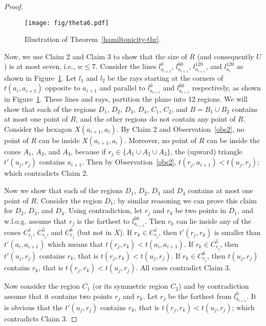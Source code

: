\documentclass[11pt,a4paper]{article}
\begin{document}
\begin{proof}
\begin{figure}[htb]
  \centering
  \texttt{[image: fig/theta6.pdf]}
 \caption{Illustration of Theorem~\ref{hamiltonicity-thr}.}
  \label{hamiltonicity-fig1}
\end{figure}

Now, we use Claim 2 and Claim 3 to show that the size of $R$ (and consequently $U$) is at most seven, i.e., $w\le 7$.
Consider the lines $l_{a_{i+1}}^0$, $l_{a_{i+1}}^{60}$, $l_{a_{i+1}}^{120}$, and $l_{a_{i}}^{120}$ as shown in Figure~\ref{hamiltonicity-fig1}. Let $l_1$ and $l_2$ be the rays starting at the corners of $t(a_i, a_{i+1})$ opposite to $a_{i+1}$ and parallel to $l_{a_{i+1}}^0$ and $l_{a_{i+1}}^{60}$ respectively, as shown in Figure~\ref{hamiltonicity-fig1}. These lines and rays, partition the plane into 12 regions. We will show that each of the regions $D_1$, $D_2$, $D_3$, $D_4$, $C_1$, $C_2$, and $B=B_1\cup B_2$ contains at most one point of $R$, and the other regions do not contain any point of $R$. Consider the hexagon $X(a_{i+1},a_i)$. By Claim 2 and Observation~\ref{obs2}, no point of $R$ can be inside $X(a_{i+1},a_i)$. Moreover, no point of $R$ can be inside the cones $A_1$, $A_2$, and $A_3$, because if $r_j\in \{A_1 \cup A_2\cup A_3\}$, the (upward) triangle $t'(u_j, r_j)$ contains $a_{i+1}$. Then by Observation~\ref{obs2}, $t(r_j, a_{i+1}) < t(u_j, r_j)$; which contradicts Claim 2.

Now we show that each of the regions $D_1$, $D_2$, $D_3$ and $D_4$ contains at most one point of $R$. Consider the region $D_1$; by similar reasoning we can prove this claim for $D_2$, $D_3$, and $D_4$. Using contradiction, let $r_j$ and $r_k$ be two points in $D_1$, and w.l.o.g. assume that $r_j$ is the farthest to $l_{a_{i+1}}^{60}$. Then $r_k$ can lie inside any of the cones $C_{r_j}^1$, $C_{r_j}^5$, and $C_{r_j}^6$ (but not in $X$). If $r_k \in C_{r_j}^1$, then $t'(r_j, r_k)$ is smaller than $t'(a_i, a_{i+1})$ which means that $t(r_j, r_k)< t(a_i,a_{i+1})$. If $r_k \in C_{r_j}^5$, then $t'(u_j,r_j)$ contains $r_k$, that is $t(r_j, r_k)< t(u_j, r_j)$. If $r_k \in C_{r_j}^6$, then $t(u_j,r_j)$ contains $r_k$, that is $t(r_j, r_k)< t(u_j, r_j)$. All cases contradict Claim 3. 

Now consider the region $C_1$ (or its symmetric region $C_2$) and by contradiction assume that it contains two points $r_j$ and $r_k$. Let $r_j$ be the farthest from $l_{a_{i+1}}^{0}$. It is obvious that the $t'(u_j, r_j)$ contains $r_k$, that is $t(r_j, r_k)< t(u_j, r_j)$; which contradicts Claim 3. 


\end{proof}
\end{document}
